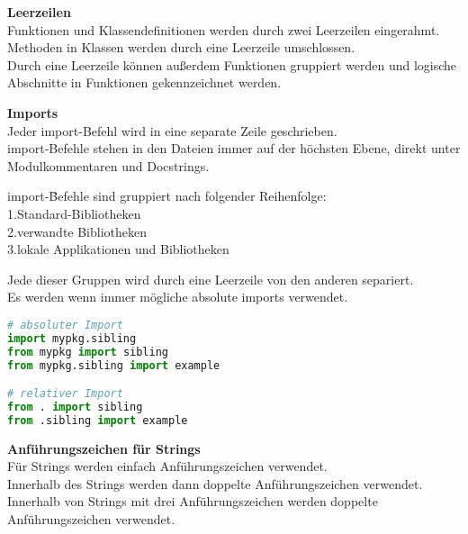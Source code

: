 \textbf{Leerzeilen}\\
Funktionen und Klassendefinitionen werden durch zwei Leerzeilen eingerahmt.\\
Methoden in Klassen werden durch eine Leerzeile umschlossen.\\
Durch eine Leerzeile können außerdem Funktionen gruppiert werden und logische Abschnitte in Funktionen gekennzeichnet werden.

\textbf{Imports}\\
Jeder import-Befehl wird in eine separate Zeile geschrieben.\\
import-Befehle stehen in den Dateien immer auf der höchsten Ebene, direkt unter Modulkommentaren und Docstrings.
\begin{tabbing}
import-\= Befehle sind gruppiert nach folgender Reihenfolge:\\
\> 1.Standard-Bibliotheken \\
\> 2.verwandte Bibliotheken \\
\> 3.lokale Applikationen und Bibliotheken\\
\end{tabbing}
Jede dieser Gruppen wird durch eine Leerzeile von den anderen separiert.\\
Es werden wenn immer mögliche absolute imports verwendet. 
\begin{lstlisting}[language = Python, caption = absolute imports, label = lst:imports]
# absoluter Import
import mypkg.sibling
from mypkg import sibling
from mypkg.sibling import example

# relativer Import
from . import sibling
from .sibling import example
\end{lstlisting}

\textbf{Anführungszeichen für Strings}\\
Für Strings werden einfach Anführungszeichen verwendet.\\
Innerhalb des Strings werden dann doppelte Anführungszeichen verwendet.\\
Innerhalb von Strings mit drei Anführungszeichen werden doppelte Anführungszeichen verwendet.\\

